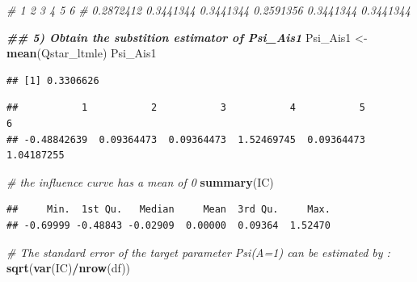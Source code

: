 \documentclass[
]{book}
\newenvironment{Shaded}{\begin{snugshade}}{\end{snugshade}}
\newcommand{\CommentTok}[1]{\textcolor[rgb]{0.56,0.35,0.01}{\textit{#1}}}
\newcommand{\DocumentationTok}[1]{\textcolor[rgb]{0.56,0.35,0.01}{\textbf{\textit{#1}}}}
\newcommand{\FunctionTok}[1]{\textcolor[rgb]{0.13,0.29,0.53}{\textbf{#1}}}
\newcommand{\NormalTok}[1]{#1}
\newcommand{\OtherTok}[1]{\textcolor[rgb]{0.56,0.35,0.01}{#1}}
\newcommand{\SpecialCharTok}[1]{\textcolor[rgb]{0.81,0.36,0.00}{\textbf{#1}}}
\begin{document}
\begin{Shaded}
\begin{Highlighting}[]
\CommentTok{\#         1         2         3         4         5         6 }
\CommentTok{\# 0.2872412 0.3441344 0.3441344 0.2591356 0.3441344 0.3441344}

\DocumentationTok{\#\# 5) Obtain the substition estimator of Psi\_Ais1}
\NormalTok{Psi\_Ais1 }\OtherTok{\textless{}{-}} \FunctionTok{mean}\NormalTok{(Qstar\_ltmle)}
\NormalTok{Psi\_Ais1}
\end{Highlighting}
\end{Shaded}

\begin{verbatim}
## [1] 0.3306626
\end{verbatim}

\begin{Shaded}
\end{Shaded}

\begin{verbatim}
##           1           2           3           4           5           6 
## -0.48842639  0.09364473  0.09364473  1.52469745  0.09364473  1.04187255
\end{verbatim}

\begin{Shaded}
\begin{Highlighting}[]
\CommentTok{\# the influence curve has a mean of 0}
\FunctionTok{summary}\NormalTok{(IC)}
\end{Highlighting}
\end{Shaded}

\begin{verbatim}
##     Min.  1st Qu.   Median     Mean  3rd Qu.     Max. 
## -0.69999 -0.48843 -0.02909  0.00000  0.09364  1.52470
\end{verbatim}

\begin{Shaded}
\begin{Highlighting}[]
\CommentTok{\# The standard error of the target parameter Psi(A=1) can be estimated by :}
\FunctionTok{sqrt}\NormalTok{(}\FunctionTok{var}\NormalTok{(IC)}\SpecialCharTok{/}\FunctionTok{nrow}\NormalTok{(df))}
\end{Highlighting}
\end{Shaded}
\end{document}
